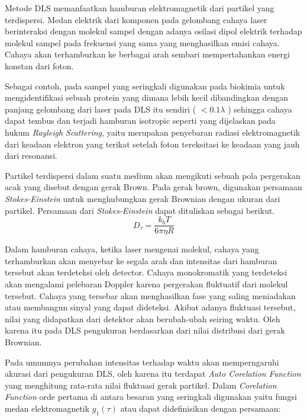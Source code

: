 Metode DLS memanfaatkan hamburan elektromagnetik dari partikel yang terdispersi. Medan elektrik
dari komponen pada gelombang cahaya laser berinteraksi dengan molekul sampel dengan adanya osilasi
dipol elektrik terhadap molekul sampel pada frekuensi yang sama yang menghasilkan emisi cahaya.
Cahaya akan terhamburkan ke berbagai arah sembari mempertahankan energi konstan dari foton. 

Sebagai contoh, pada sampel yang seringkali digunakan pada biokimia untuk mengidentifikasi sebuah
protein yang dimana lebih kecil dibandingkan dengan panjang gelombang dari laser pada DLS itu
sendiri ( $<0.1\lambda$ ) sehingga cahaya dapat tembus dan terjadi hamburan isotropic seperti yang
dijelaskan pada hukum \textit{Rayleigh Scattering}, yaitu merupakan penyebaran radiasi
elektromagnetik dari keadaan elektron yang terikat setelah foton tereksitasi ke keadaan yang jauh
dari resonansi\cite{Piazza2005}.

Partikel terdispersi dalam suatu medium akan mengikuti sebuah pola pergerakan acak yang disebut
dengan gerak Brown. Pada gerak brown, digunakan persamaan \textit{Stokes-Einstein} untuk
menghubungkan gerak Brownian dengan ukuran dari partikel\cite{Anindya2018}. Persamaan dari
\textit{Stokes-Einstein} dapat dituliskan sebagai berikut.
\begin{equation}
    D_{\tau} = \frac{k_b T}{6 \pi \eta R}
\end{equation}

Dalam hamburan cahaya, ketika laser mengenai molekul, cahaya yang terhamburkan akan menyebar ke
segala arah dan intensitas dari hamburan tersebut akan terdeteksi oleh detector. Cahaya monokromatik
yang terdeteksi akan mengalami pelebaran Doppler karena pergerakan fluktuatif dari molekul tersebut.
Cahaya yang tersebar akan menghasilkan fase yang saling meniadakan atau membangun sinyal yang dapat
dideteksi. Akibat adanya fluktuasi tersebut, nilai yang didapatkan dari detektor akan berubah-ubah
seiring waktu. Oleh karena itu pada DLS pengukuran berdasarkan dari nilai distribusi dari gerak
Brownian\cite{Falke2019,Pavan2022}. 

Pada umumnya perubahan intensitas terhadap waktu akan memperngaruhi akurasi dari pengukuran DLS,
oleh karena itu terdapat \textit{Auto Corelation Function} yang menghitung rata-rata nilai
fluktuasi gerak partikel. Dalam \textit{Corelation Function} orde pertama di antara besaran
yang seringkali digunakan yaitu fungsi medan elektromagnetik ${g_1 (\tau)}$ atau dapat
didefinisikan dengan persamaan:

